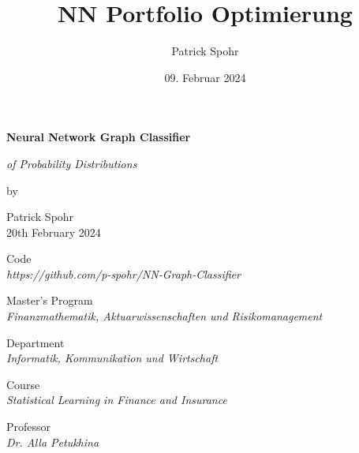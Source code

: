 \documentclass[12pt]{article}
\title{NN Portfolio Optimierung}
\date{09. Februar 2024}
\author{Patrick Spohr}
\begin{document}
    \renewcommand{\figurename}{Visual}
    \renewcommand{\tablename}{Visual}

    \begin{titlepage}
        
        \centering
        \Huge \textbf{Neural Network Graph Classifier}

        \vspace{7mm}
        
        \centering
        \Large \textit{of Probability Distributions} 

        \vspace{7mm}

        \centering
        \large by

        \vspace{7mm}

        \large Patrick Spohr
        \vspace{2mm}
        \\ 20th February 2024

        \vspace{10mm}

        \centering
        \large Code
        \vspace{1mm}
        \\ \normalsize \textit{https://github.com/p-spohr/NN-Graph-Classifier} 
        
        \vspace{20mm}

        \centering
        \large Master’s Program
        \vspace{1mm}
        \\ \normalsize \textit{Finanzmathematik, Aktuarwissenschaften und Risikomanagement} 

        \vspace{5mm}

        \centering
        \large Department
        \vspace{1mm}
        \\ \normalsize \textit{Informatik, Kommunikation und Wirtschaft} 

        \vspace{5mm}

        \centering
        \large Course 
        \vspace{1mm}       
        \\ \normalsize \textit{Statistical Learning in Finance and Insurance} 

        \vspace{5mm}

        \centering
        \large Professor
        \vspace{1mm}
        \\ \normalsize \textit{Dr. Alla Petukhina} 


    \end{titlepage}
\end{document}
